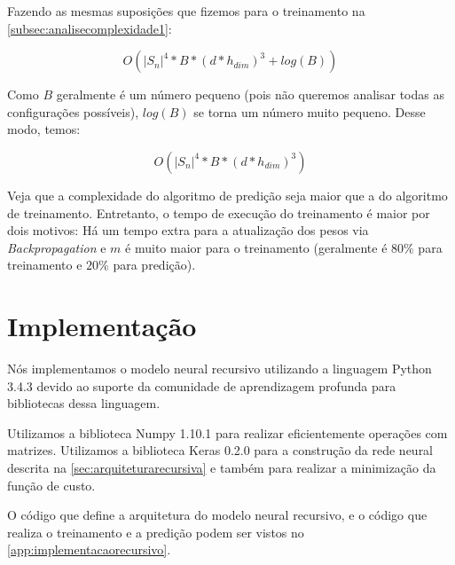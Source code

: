 Fazendo as mesmas suposições que fizemos para o treinamento na \autoref{subsec:analisecomplexidade1}:

\begin{equation} 
O(|S_n|^4 * B * (d*h_{dim})^3 + log(B)) \nonumber
\end{equation}

Como $B$ geralmente é um número pequeno (pois não queremos analisar todas as configurações possíveis), $log(B)$ se torna um número muito pequeno. Desse modo, temos:

\begin{equation} 
O(|S_n|^4 * B * (d*h_{dim})^3) \nonumber
\end{equation}

Veja que a complexidade do algoritmo de predição seja maior que a do algoritmo de treinamento. Entretanto, o tempo de execução do treinamento é maior por dois motivos: Há um tempo extra para a atualização dos pesos via \textit{Backpropagation} e $m$ é muito maior para o treinamento (geralmente é $80\%$ para treinamento e $20\%$ para predição).





\section{Implementação}

Nós implementamos o modelo neural recursivo utilizando a linguagem Python 3.4.3 devido ao suporte da comunidade de aprendizagem profunda para bibliotecas dessa linguagem. 

Utilizamos a biblioteca Numpy 1.10.1 para realizar eficientemente operações com matrizes. Utilizamos a biblioteca Keras 0.2.0 para a construção da rede neural descrita na \autoref{sec:arquiteturarecursiva} e também para realizar a minimização da função de custo.

O código que define a arquitetura do modelo neural recursivo, e o código que realiza o treinamento e a predição podem ser vistos no \autoref{app:implementacaorecursivo}.







